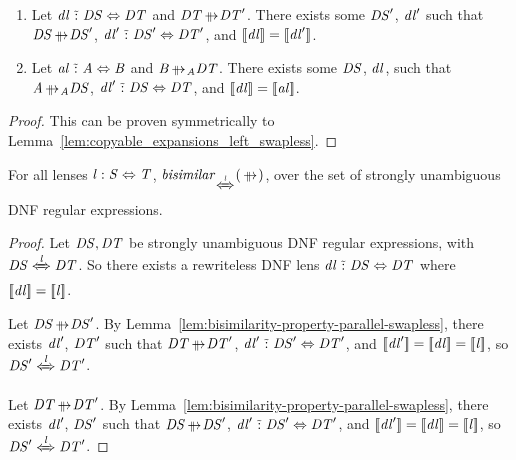 \documentclass[acmsmall]{acmart}
\begin{document}
\begin{lemma}
  \label{lem:copyable_expansions_right_swapless}\leavevmode
  \begin{enumerate}
  \item Let $\mathit{dl} \,\,\tilde{:}\,\, \mathit{DS} \Leftrightarrow
    \mathit{DT}$ and $\DNFRegexAlt \ParallelRewrite \DNFRegexAlt'$.  There exists some
    $\mathit{DS}'$, $\mathit{dl}'$ such that $\DNFRegex \ParallelRewrite
    \DNFRegex'$,
    $\mathit{dl}' \,\,\tilde{:}\,\,
    \mathit{DS}' \Leftrightarrow \mathit{DT}'$, and $[ \! [\mathit{dl}] \! ] =
    [ \! [\mathit{dl}'] \! ]$.
  \item Let $\mathit{al} \,\,\tilde{:}\,\, \mathit{A} \Leftrightarrow \mathit{B}$ and
    $\AtomAlt \ParallelRewriteAtom \DNFRegexAlt$.  There exists some $\mathit{DS}$,
    $\mathit{dl}$, such that $\Atom \ParallelRewriteAtom \DNFRegex$,
    $\mathit{dl}' \,\,\tilde{:}\,\, \mathit{DS}
    \Leftrightarrow \mathit{DT}$, and $[ \! [\mathit{dl}] \! ] =
    [ \! [\mathit{al}] \! ]$.
  \end{enumerate}
\end{lemma}
\begin{proof}
  This can be proven symmetrically to Lemma~\ref{lem:copyable_expansions_left_swapless}.
\end{proof}

\begin{lemma}
  \label{lem:bisimilarity-property-parallel-swapless}
  For all lenses $\mathit{l} : \mathit{S} \Leftrightarrow \mathit{T}$,
  $\IsBisimilarWithPropertyOf{\ParallelRewrite}{\DNFLensHasSemanticsOf{\Lens}}$,
  over the set of strongly unambiguous DNF regular expressions.
\end{lemma}
\begin{proof}
  Let $\mathit{DS},\mathit{DT}$ be strongly unambiguous DNF regular expressions,
  with $\DNFRegex \DNFLensHasSemanticsOf{\Lens} \DNFRegexAlt$.
  So there exists a rewriteless DNF lens
  $\mathit{dl} \,\,\tilde{:}\,\, \mathit{DS} \Leftrightarrow \mathit{DT}$ where
  $[ \! [\mathit{dl}] \! ] = [ \! [\mathit{l}] \! ]$.

  Let $\DNFRegex \ParallelRewrite \DNFRegex'$.  By
  Lemma~\ref{lem:bisimilarity-property-parallel-swapless}, there exists $\mathit{dl}'$,
  $\mathit{DT}'$ such that $\DNFRegexAlt \ParallelRewrite \DNFRegexAlt'$,
  $\mathit{dl}' \,\,\tilde{:}\,\, \mathit{DS}' \Leftrightarrow \mathit{DT}'$,
  and $[ \! [\mathit{dl}'] \! ] = [ \! [\mathit{dl}] \! ] = [ \! [\mathit{l}] \! ]$,
  so $\DNFRegex' \DNFLensHasSemanticsOf{\Lens} \DNFRegexAlt'$.

  Let $\DNFRegexAlt \ParallelRewrite \DNFRegexAlt'$.  By
  Lemma~\ref{lem:bisimilarity-property-parallel-swapless}, there exists $\mathit{dl}'$,
  $\mathit{DS}'$ such that $\DNFRegex \ParallelRewrite \DNFRegex'$,
  $\mathit{dl}' \,\,\tilde{:}\,\, \mathit{DS}' \Leftrightarrow \mathit{DT}'$,
  and $[ \! [\mathit{dl}'] \! ] = [ \! [\mathit{dl}] \! ] = [ \! [\mathit{l}] \! ]$,
  so $\DNFRegex' \DNFLensHasSemanticsOf{\Lens} \DNFRegexAlt'$.
\end{proof}
\end{document}
